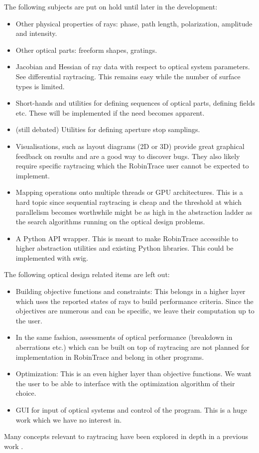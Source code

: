 The following subjects are put on hold until later in the development:
\begin{itemize}
\item Other physical properties of rays: phase, path length, polarization,
amplitude and intensity.
\item Other optical parts: freeform shapes, gratings.
\item Jacobian and Hessian of ray data with respect to optical system
parameters. See differential raytracing. This remains easy while the
number of surface types is limited.
\item Short-hands and utilities for defining sequences of optical parts,
defining fields etc. These will be implemented if the need becomes apparent.
\item (still debated) Utilities for defining aperture stop samplings.
\item Visualisations, such as layout diagrams (2D or 3D) provide great
graphical feedback on results and are a good way to discover bugs. They also
likely require specific raytracing which the RobinTrace user cannot be
expected to implement.
\item Mapping operations onto multiple threads or GPU architectures. This
is a hard topic since sequential raytracing is cheap and the threshold
at which parallelism becomes worthwhile might be as high in the abstraction
ladder as the search algorithms running on the optical design problems.
\item A Python API wrapper. This is meant to make RobinTrace accessible
to higher abstraction utilities and existing Python libraries. This could be
implemented with swig.
\end{itemize}

The following optical design related items are left out:
\begin{itemize}
\item Building objective functions and constraints: This belongs in a higher
layer which uses the reported states of rays to build performance criteria.
Since the objectives are numerous and can be specific, we leave their
computation up to the user.
\item In the same fashion, assessments of optical performance
(breakdown in aberrations etc.) which can be built on top of raytracing
are not planned for implementation in RobinTrace and belong in other
programs.
\item Optimization: This is an even higher layer than objective functions.
We want the user to be able to interface with the optimization algorithm
of their choice.
\item GUI for input of optical systems and control of the program. This
is a huge work which we have no interest in.
\end{itemize}

Many concepts relevant to raytracing have been explored in depth in a previous
work \cite{Houllier-thesis}.

